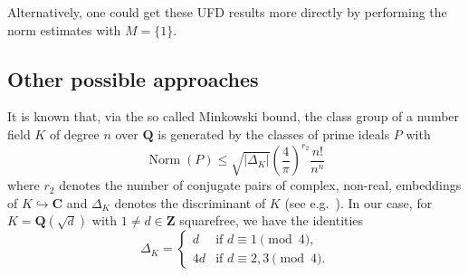 \documentclass[sigplan,10pt,nonacm,
screen]{acmart} \settopmatter{printfolios=true,printccs=false,printacmref=false}
\newcommand{\QQ}{\mathbf{Q}}
\newcommand{\ZZ}{\mathbf{Z}}
\newcommand{\CC}{\mathbf{C}}
\newcommand{\OK}{\mathcal{O}_K}
\DeclareMathOperator{\Norm}{Norm}
\begin{document}
Alternatively, one could get these UFD results more directly by performing the norm estimates with $M= \{1\}$.


%


\subsection{Other possible approaches}\label{sec:OtherApproaches}

It is known that, via the so called Minkowski bound, the class group of a number field $K$ of degree $n$ over $\QQ$ is generated by the classes of prime ideals $P$ with
\begin{equation}\label{eqn:Minkowski}
\Norm(P) \leq \sqrt{|\Delta_K|}\left(\dfrac{4}{\pi}\right)^{r_2}\dfrac{n!}{n^n}
\end{equation}
where $r_2$ denotes the number of conjugate pairs of complex, non-real, embeddings of $K \hookrightarrow \CC$ and $\Delta_K$ denotes the discriminant of $K$ (see e.g.\ \cite[Section I.5]{Neukirch}). In our case, for $K=\QQ(\sqrt{d})$ with $1\not=d \in \ZZ$ squarefree, we have the identities
\begin{equation*}
\Delta_K = \left\lbrace
\begin{array}{ll}
d & \text{if } d \equiv 1 \pmod 4, \\
4d & \text{if } d \equiv 2,3 \pmod 4.
\end{array}
\right.
\end{equation*}
\end{document}
